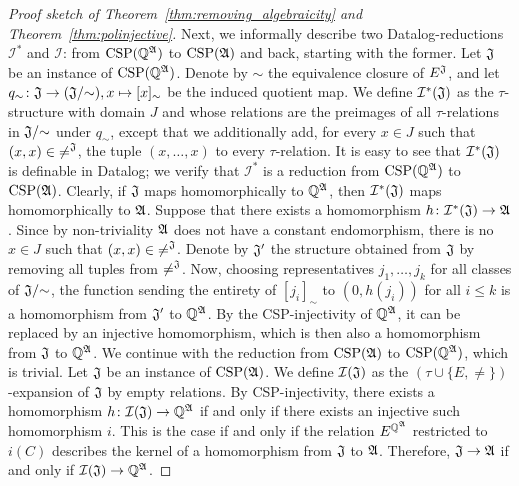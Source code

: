 \begin{proof}[Proof sketch of Theorem~\ref{thm:removing_algebraicity} and Theorem~\ref{thm:polinjective}]
Next, we informally describe two Datalog-reductions $\mathcal{I}^{\ast}$ and $\mathcal{I}$: from $\mathrm{CSP}(\mathbb{Q}^{\mathfrak{A}})$ to $\mathrm{CSP}(\mathfrak{A})$ and back, starting with the former. 
%  
Let $\mathfrak{J}$ be an instance of $\mathrm{CSP}(\mathbb{Q}^{\mathfrak{A}})$.
%
Denote by $\sim$ the equivalence closure of $E^{\mathfrak{J}}$, and let $q_{\sim}\colon \mathfrak{J}\rightarrow (\mathfrak{J}/{\sim}), x \mapsto [x]_{\sim}$ be the induced quotient map.
%
We define $\mathcal{I}^{\ast}(\mathfrak{J})$ as the $\tau$-structure with domain $J$ and whose relations are the preimages of all $\tau$-relations in $\mathfrak{J}/{\sim}$ under $q_{\sim}$, except that we additionally add, for every $x\in J$ such that $(x,x)\in {\neq}^{\mathfrak{J}}$, the tuple $(x,\dots, x)$ to every $\tau$-relation.
%
It is easy to see that $\mathcal{I}^{\ast}(\mathfrak{J})$ is definable in Datalog; we verify that $\mathcal{I}^{\ast}$ is a reduction from $\mathrm{CSP}(\mathbb{Q}^{\mathfrak{A}})$ to $\mathrm{CSP}(\mathfrak{A})$. 
%
Clearly, if $\mathfrak{J}$ maps homomorphically to $\mathbb{Q}^{\mathfrak{A}}$, then $\mathcal{I}^{\ast}(\mathfrak{J})$ maps homomorphically to $\mathfrak{A}$.
%
Suppose that there exists a homomorphism $h\colon \mathcal{I}^{\ast}(\mathfrak{J})\rightarrow\mathfrak{A}$.
%
Since by non-triviality  $\mathfrak{A}$ does not have a constant endomorphism, there is no $x\in J$ such that $(x,x)\in {\neq}^{\mathfrak{J}}$. 
%
Denote by $\mathfrak{J}'$ the structure obtained from $\mathfrak{J}$ by removing all tuples from ${\neq}^{\mathfrak{J}}$.
%
Now, choosing representatives $j_1,\dots,j_k$ for all classes of $\mathfrak{J}/{\sim}$, the function sending the entirety of $[j_i]_\sim$ to $(0,h(j_i))$ for all $i\leq k$ is a homomorphism from $\mathfrak{J}'$ to $\mathbb{Q}^{\mathfrak{A}}$.
%
By the CSP-injectivity of $\mathbb{Q}^{\mathfrak{A}}$, it can be replaced by an injective homomorphism, which is then also a homomorphism from $\mathfrak{J}$ to $\mathbb{Q}^{\mathfrak{A}}$.
% 
We continue with the reduction from $\mathrm{CSP}(\mathfrak{A})$ to $\mathrm{CSP}(\mathbb{Q}^{\mathfrak{A}})$, which is trivial.
%
Let $\mathfrak{J}$ be an instance of $\mathrm{CSP}(\mathfrak{A})$.
%
We define $\mathcal{I}(\mathfrak{J})$ as the $(\tau\cup \{E,\neq\})$-expansion of $\mathfrak{J}$ by empty relations.
%
By CSP-injectivity, there exists a homomorphism $h\colon \mathcal{I}(\mathfrak{J}) \rightarrow \mathbb{Q}^{\mathfrak{A}}$ if and only if there exists an injective such homomorphism $i$.
%
This is the case if and only if the relation $E^{\mathbb{Q}^{\mathfrak{A}}}$ restricted to $i(C)$ describes the kernel of a homomorphism from  $\mathfrak{J}$ to $\mathfrak{A}$.
Therefore, $\mathfrak{J}\rightarrow\mathfrak{A}$ if and only if $\mathcal{I}(\mathfrak{J})\rightarrow\mathbb{Q}^{\mathfrak{A}}$. 
 

\end{proof}
